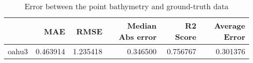 \begin{table}[h!]
\caption{Error between the point bathymetry and ground-truth data}
\label{tab:oahu3_lidar_error}
\begin{tabular}{lrrrrr}
\toprule
 & MAE & RMSE & Median Abs error & R2 Score & Average Error \\
\midrule
oahu3 & 0.463914 & 1.235418 & 0.346500 & 0.756767 & 0.301376 \\
\bottomrule
\end{tabular}
\end{table}
